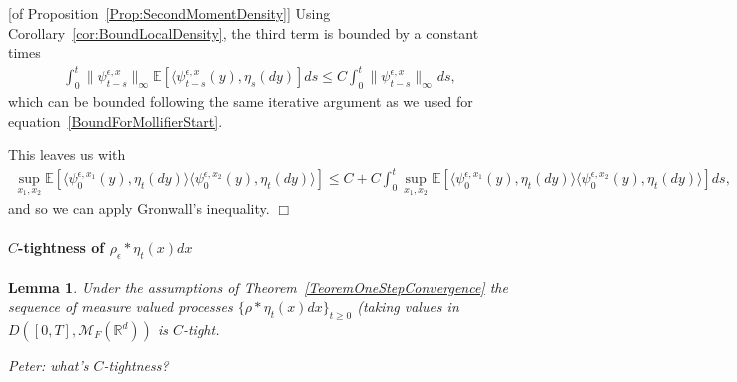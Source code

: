 \documentclass[12pt]{article}
\newenvironment {proof}{{\noindent\bf Proof }}{\hfill $\Box$ \medskip}
\newtheorem{lemma}[theorem]{Lemma}
\newcommand{\IE}{\mathbb E}
\newcommand{\IR}{\mathbb R}
\newcommand{\measures}{\mathcal{M}_F(\IR^d)} %
\newcommand{\comment}[1]{{\color{blue} \it #1}}
\begin{document}
\begin{proof}[of Proposition~\ref{Prop:SecondMomentDensity}]
    Using Corollary~\ref{cor:BoundLocalDensity},
    the third term is bounded by a constant times
    \begin{align*}
        \int_0^t
            \|\psi^{\epsilon,x}_{t-s}\|_\infty
            \IE[ \langle \psi^{\epsilon,x}_{t-s}(y), \eta_s(dy) ]
        ds 
        \le
        C \int_0^t \|\psi^{\epsilon,x}_{t-s}\|_\infty ds ,
    \end{align*}
    which can be bounded following the same iterative argument
    as we used for equation~\ref{BoundForMollifierStart}.

    This leaves us with
    \begin{align*}
        \sup_{x_1, x_2} \IE\left[
            \langle \psi^{\epsilon,x_1}_0(y), \eta_t(dy) \rangle
            \langle \psi^{\epsilon,x_2}_0(y), \eta_t(dy) \rangle
        \right]
        \le C  + C \int_0^t
            \sup_{x_1, x_2} \IE\left[
                \langle \psi^{\epsilon,x_1}_0(y), \eta_t(dy) \rangle
                \langle \psi^{\epsilon,x_2}_0(y), \eta_t(dy) \rangle
            \right]
            ds,
    \end{align*}
    and so we can apply Gronwall's inequality.
\end{proof}


\paragraph{$C$-tightness of $\rho_\epsilon * \eta_t(x) dx$ }

\begin{lemma}
        \label{lem:density_tightness}
    Under the assumptions of Theorem~\ref{TeoremOneStepConvergence}
    the sequence of measure valued processes $\{ \rho*\eta_t(x) dx \}_{t \geq 0}$
    (taking values in $D([0,T], \measures)$ is $C$-tight.
\end{lemma}

\comment{Peter: what's $C$-tightness?}
\end{document}
